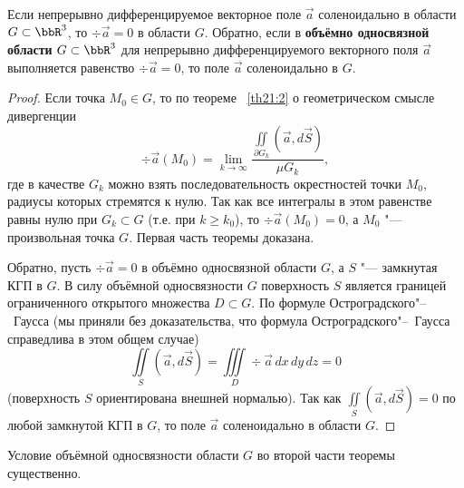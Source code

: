 \begin{thm}
Если непрерывно дифференцируемое векторное поле $\vec{a}$ соленоидально в области $G \subset \bbR^3$, то $\div \vec{a} = 0$ в области $G$. Обратно, если в \textbf{объёмно односвязной области} $G \subset \bbR^3$ для непрерывно дифференцируемого векторного поля $\vec{a}$ выполняется равенство $\div \vec{a} = 0$, то поле $\vec{a}$ соленоидально в $G$.
\end{thm}

\begin{proof}
Если точка $M_0 \in G$, то по теореме ~\ref{th21:2} о геометрическом смысле дивергенции
$$
\div \vec{a}(M_0) = \lim_{k \to \infty} \frac{\iint\limits_{\partial G_k} (\vec{a}, d\vec{S})}{\mu G_k},
$$
где в качестве $G_k$ можно взять последовательность окрестностей точки $M_0$, радиусы которых стремятся к нулю. Так как все интегралы в этом равенстве равны нулю при $G_k \subset G$ (т.е. при $k \geqslant k_0$), то $\div \vec{a}(M_0) = 0$, а $M_0$ "--- произвольная точка $G$. Первая часть теоремы доказана.

Обратно, пусть $\div \vec{a} = 0$ в объёмно односвязной области $G$, а $S$ "--- замкнутая КГП в $G$. В силу объёмной односвязности $G$ поверхность $S$ является границей ограниченного открытого множества $D \subset G$. По формуле Остроградского"--~Гаусса (мы приняли без доказательства, что формула Остроградского"--~Гаусса справедлива в этом общем случае)
$$
\iint\limits_S (\vec{a}, d\vec{S}) = \iiint\limits_D \div \vec{a}\,dx\,dy\,dz = 0
$$
(поверхность $S$ ориентирована внешней нормалью). Так как $\iint\limits_S (\vec{a}, d\vec{S}) = 0$ по любой замкнутой КГП в $G$, то поле $\vec{a}$ соленоидально в области $G$.
\end{proof}

\begin{notion}
Условие объёмной односвязности области $G$ во второй части теоремы существенно.
\end{notion}